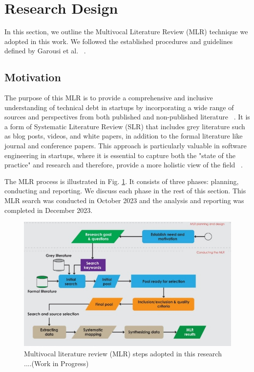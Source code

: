 \documentclass[manuscript]{acmart}
\begin{document}
\section{Research Design}
In this section, we outline the Multivocal Literature Review (MLR) technique we adopted in this work. We followed the established procedures and guidelines defined by Garousi et al. ~\cite{GAROUSI2019101}.

\subsection{Motivation}
The purpose of this MLR is to provide a comprehensive and inclusive understanding of technical debt in startups by incorporating a wide range of sources and perspectives from both published and non-published literature ~\cite{Ogawa91, Garousi2016/2915970.2916008}. It is a form of Systematic Literature Review (SLR) that includes grey literature such as blog posts, videos, and white papers, in addition to the formal literature like journal and conference papers. This approach is particularly valuable in software engineering in startups, where it is essential to capture both the "state of the practice" and research and therefore, provide a more holistic view of the field ~\cite{Garousi2016/2915970.2916008}.

The MLR process is illustrated in Fig. \ref{fig:MLRprocess}. It consists of three phases: planning, conducting and reporting. We discuss each phase in the rest of this section. This MLR search was conducted in October 2023 and the analysis and reporting was completed in December 2023.

\begin{figure}
  \includegraphics[width=\textwidth]{MLRprocess.jpg}
  \caption{Multivocal literature review (MLR) steps adopted in this research ....(Work in Progress)}
  \label{fig:MLRprocess}
\end{figure}
\end{document}
